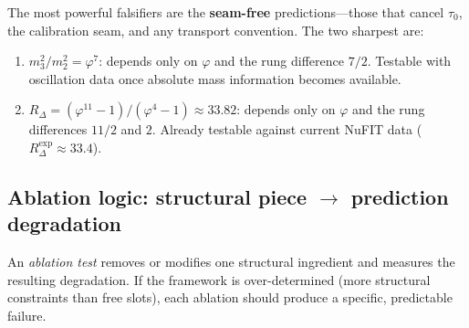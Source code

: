 \documentclass[11pt,a4paper]{article}
\theoremstyle{definition}
\theoremstyle{remark}
\newcommand{\phig}{\varphi}
\begin{document}

\noindent
The most powerful falsifiers are the \textbf{seam-free} predictions---those
that cancel $\tau_0$, the calibration seam, and any transport
convention.  The two sharpest are:

\begin{enumerate}[nosep]
  \item $m_3^2/m_2^2 = \phig^7$: depends only on $\phig$ and the rung
    difference $7/2$.  Testable with oscillation data once absolute mass
    information becomes available.
  \item $R_\Delta = (\phig^{11}-1)/(\phig^4-1) \approx 33.82$: depends
    only on $\phig$ and the rung differences $11/2$ and $2$.  Already
    testable against current NuFIT data ($R_\Delta^{\mathrm{exp}} \approx 33.4$).
\end{enumerate}

\subsection{Ablation logic: structural piece $\to$ prediction degradation}

An \emph{ablation test} removes or modifies one structural ingredient and
measures the resulting degradation.  If the framework is over-determined
(more structural constraints than free slots), each ablation should produce
a specific, predictable failure.
\end{document}
